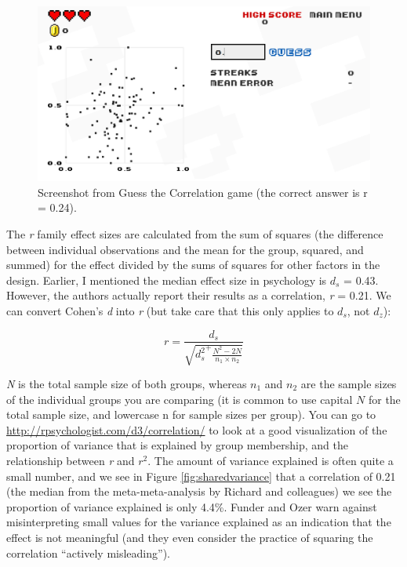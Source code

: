 \documentclass[
  oneside]{krantz}
\begin{document}
\begin{figure}

{\centering \includegraphics[width=1\linewidth]{images/guesscorrelation} 

}

\caption{Screenshot from Guess the Correlation game (the correct answer is r = 0.24).}\label{fig:guesscorrelation}
\end{figure}

The \emph{r} family effect sizes are calculated from the sum of squares (the difference between individual observations and the mean for the group, squared, and summed) for the effect divided by the sums of squares for other factors in the design. Earlier, I mentioned the median effect size in psychology is \(d_s\) = 0.43. However, the authors actually report their results as a correlation, \emph{r} = 0.21. We can convert Cohen's \emph{d} into \emph{r} (but take care that this only applies to \(d_s\), not \(d_z\)):

\[r = \frac{d_s}{\sqrt{{d_s^{2}}^{+}\frac{N^{2} - 2N}{n_{1} \times n_{2}}}}\]

\emph{N} is the total sample size of both groups, whereas \(n_1\) and \(n_2\) are the sample sizes of the individual groups you are comparing (it is common to use capital \(N\) for the total sample size, and lowercase n for sample sizes per group). You can go to \url{http://rpsychologist.com/d3/correlation/} to look at a good visualization of the proportion of variance that is explained by group membership, and the relationship between \emph{r} and \(r^2\). The amount of variance explained is often quite a small number, and we see in Figure \ref{fig:sharedvariance} that a correlation of 0.21 (the median from the meta-meta-analysis by Richard and colleagues) we see the proportion of variance explained is only 4.4\%. Funder and Ozer \citeyearpar{funder_evaluating_2019} warn against misinterpreting small values for the variance explained as an indication that the effect is not meaningful (and they even consider the practice of squaring the correlation ``actively misleading'').
\end{document}

